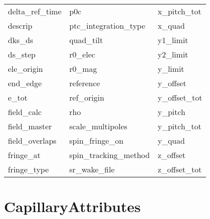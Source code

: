 \begin{tabular}{lll}
delta_ref_time              & p0c                         & x_pitch_tot                 \\
descrip                     & ptc_integration_type        & x_quad                      \\
dks_ds                      & quad_tilt                   & y1_limit                    \\
ds_step                     & r0_elec                     & y2_limit                    \\
ele_origin                  & r0_mag                      & y_limit                     \\
end_edge                    & reference                   & y_offset                    \\
e_tot                       & ref_origin                  & y_offset_tot                \\
field_calc                  & rho                         & y_pitch                     \\
field_master                & scale_multipoles            & y_pitch_tot                 \\
field_overlaps              & spin_fringe_on              & y_quad                      \\
fringe_at                   & spin_tracking_method        & z_offset                    \\
fringe_type                 & sr_wake_file                & z_offset_tot                \\
 \bottomrule
 \end{tabular}
 \vfill
 
 \section{CapillaryAttributes}
 \label{s:list.capillary}
 
